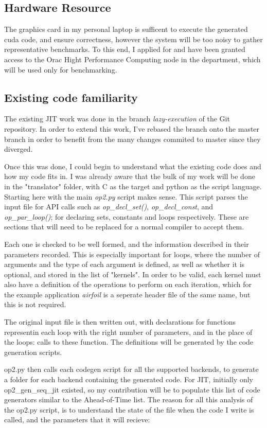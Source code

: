 \documentclass[11pt]{article}
\begin{document}
\subsection*{Hardware Resource}
The graphics card in my personal laptop is sufficent to execute the generated cuda code, and ensure correctness, however the system will be too noisy to gather representative benchmarks. To this end, I applied for and have been granted access to the Orac Hight Performance Computing node in the department, which will be used only for benchmarking.

\subsection*{Existing code familiarity}
The existing JIT work was done in the branch \textit{lazy-execution} of the Git repository. In order to extend this work, I've rebased the branch onto the master branch in order to benefit from the many changes commited to master since they diverged. 
\par Once this was done, I could begin to understand what the existing code does and how my code fits in. I was already aware that the bulk of my work will be done in the "translator" folder, with C as the target and python as the script language. Starting here with the main \textit{op2.py} script makes sense. This script parses the input file for API calls such as \textit{op\_decl\_set()}, \textit{op\_decl\_const}, and \textit{op\_par\_loop()}; for declaring sets, constants and loops respectively. These are sections that will need to be replaced for a normal compiler to accept them.
\par Each one is checked to be well formed, and the information described in their parameters recorded. This is especially important for loops, where the number of arguments and the type of each argument is defined, as well as whether it is optional, and stored in the list of "kernels". In order to be valid, each kernel must also have a definition of the operations to perform on each iteration, which for the example application \textit{airfoil} is a seperate header file of the same name, but this is not required.
\par The original input file is then written out, with declarations for functions representin each loop with the right number of parameters, and in the place of the loops: calls to these function. The definitions will be generated by the code generation scripts. 
\par op2.py then calls each codegen script for all the supported backends, to generate a folder for each backend containing the generated code. For JIT, initially only op2\_gen\_seq\_jit existed, so my contribution will be to populate this list of code generators similar to the Ahead-of-Time list. The reason for all this analysis of the op2.py script, is to understand the state of the file when the code I write is called, and the parameters that it will recieve:
\end{document}
